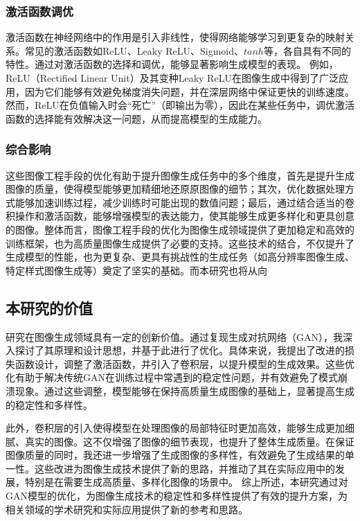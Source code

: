 \documentclass[UTF8]{ctexart}
\begin{document}
\subsubsection{激活函数调优}
激活函数在神经网络中的作用是引入非线性，使得网络能够学习到更复杂的映射关系。常见的激活函数如ReLU、Leaky ReLU、Sigmoid、$tanh$等，各自具有不同的特性。通过对激活函数的选择和调优，能够显著影响生成模型的表现。
例如，ReLU（Rectified Linear Unit）及其变种Leaky ReLU在图像生成中得到了广泛应用，因为它们能够有效避免梯度消失问题，并在深层网络中保证更快的训练速度。然而，ReLU在负值输入时会“死亡”（即输出为零），因此在某些任务中，调优激活函数的选择能有效解决这一问题，从而提高模型的生成能力。

\subsubsection{综合影响}
这些图像工程手段的优化有助于提升图像生成任务中的多个维度，首先是提升生成图像的质量，使得模型能够更加精细地还原原图像的细节；其次，优化数据处理方式能够加速训练过程，减少训练时可能出现的数值问题；最后，通过结合适当的卷积操作和激活函数，能够增强模型的表达能力，使其能够生成更多样化和更具创意的图像。整体而言，图像工程手段的优化为图像生成领域提供了更加稳定和高效的训练框架，也为高质量图像生成提供了必要的支持。这些技术的结合，不仅提升了生成模型的性能，也为更复杂、更具有挑战性的生成任务（如高分辨率图像生成、特定样式图像生成等）奠定了坚实的基础。而本研究也将从向


\subsection{本研究的价值}

研究在图像生成领域具有一定的创新价值。通过复现生成对抗网络（GAN），我深入探讨了其原理和设计思想，并基于此进行了优化。具体来说，我提出了改进的损失函数设计，调整了激活函数，并引入了卷积层，以提升模型的生成效果。这些优化有助于解决传统GAN在训练过程中常遇到的稳定性问题，并有效避免了模式崩溃现象。通过这些调整，模型能够在保持高质量生成图像的基础上，显著提高生成的稳定性和多样性。

此外，卷积层的引入使得模型在处理图像的局部特征时更加高效，能够生成更加细腻、真实的图像。这不仅增强了图像的细节表现，也提升了整体生成质量。在保证图像质量的同时，我还进一步增强了生成图像的多样性，有效避免了生成结果的单一性。这些改进为图像生成技术提供了新的思路，并推动了其在实际应用中的发展，特别是在需要生成高质量、多样化图像的场景中。
综上所述，本研究通过对GAN模型的优化，为图像生成技术的稳定性和多样性提供了有效的提升方案，为相关领域的学术研究和实际应用提供了新的参考和思路。
\end{document}
